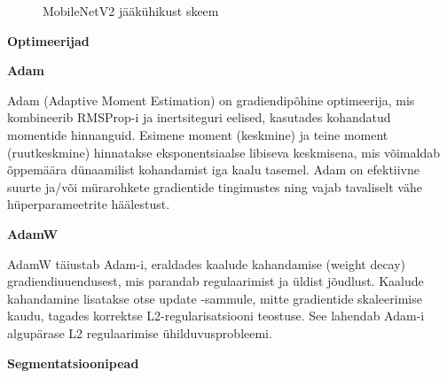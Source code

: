 \begin{figure}[H]
    \centering

    \caption{MobileNetV2 jääkühikust skeem}
    \label{fig:MobileNetV2jääkühikust}
\end{figure}

\textbf{Optimeerijad}

\textbf{Adam}

Adam (Adaptive Moment Estimation) on gradiendipõhine optimeerija, mis kombineerib RMSProp-i ja inertsiteguri eelised, kasutades kohandatud momentide hinnanguid. Esimene moment (keskmine) ja teine moment (ruutkeskmine) hinnatakse eksponentsiaalse libiseva keskmisena, mis võimaldab õppemäära dünaamilist kohandamist iga kaalu tasemel. Adam on efektiivne suurte ja/või mürarohkete gradientide tingimustes ning vajab tavaliselt vähe hüperparameetrite häälestust.

\textbf{AdamW}

AdamW täiustab Adam-i, eraldades kaalude kahandamise (weight decay) gradiendiuuendusest, mis parandab regulaarimist ja üldist jõudlust. Kaalude kahandamine lisatakse otse update -sammule, mitte gradientide skaleerimise kaudu, tagades korrektse L2-regularisatsiooni teostuse. See lahendab Adam-i algupärase L2 regulaarimise ühilduvusprobleemi.

\textbf{Segmentatsioonipead}

